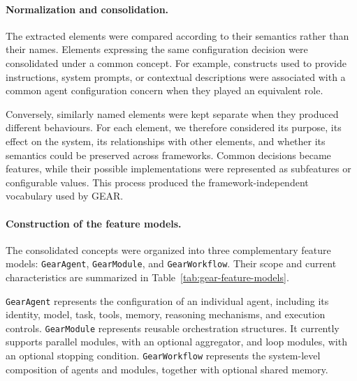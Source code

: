 \paragraph{\textbf{Normalization and consolidation.}}
The extracted elements were compared according to their semantics rather than
their names. Elements expressing the same configuration decision were
consolidated under a common concept. For example, constructs used to provide
instructions, system prompts, or contextual descriptions were associated with
a common agent configuration concern when they played an equivalent role.

Conversely, similarly named elements were kept separate when they produced
different behaviours. For each element, we therefore considered its purpose,
its effect on the system, its relationships with other elements, and whether
its semantics could be preserved across frameworks. Common decisions became
features, while their possible implementations were represented as
subfeatures or configurable values. This process produced the
framework-independent vocabulary used by GEAR.


\paragraph{\textbf{Construction of the feature models.}}
The consolidated concepts were organized into three complementary feature
models: \texttt{GearAgent}, \texttt{GearModule}, and
\texttt{GearWorkflow}. Their scope and current characteristics are summarized
in Table~\ref{tab:gear-feature-models}.

\texttt{GearAgent} represents the configuration of an individual agent,
including its identity, model, task, tools, memory, reasoning mechanisms, and
execution controls. \texttt{GearModule} represents reusable orchestration
structures. It currently supports parallel modules, with an optional
aggregator, and loop modules, with an optional stopping condition.
\texttt{GearWorkflow} represents the system-level composition of agents and
modules, together with optional shared memory.

